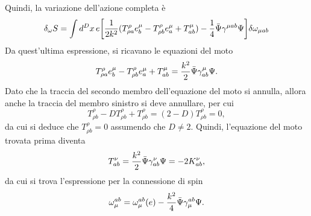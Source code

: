 Quindi, la variazione dell'azione completa è 
\begin{equation}
    \delta_\omega S = \int d^Dx\,e\bigg[\frac{1}{2k^2}(T^\rho_{\rho a}e^\mu_b - T^\rho_{\rho b}e^\mu_a + T^\mu_{ab}) - \frac{1}{4}\bar{\Psi}\gamma^{\mu ab}\Psi\bigg]\delta\omega_{\mu ab}
\end{equation}
Da quest'ultima espressione, si ricavano le equazioni del moto
\begin{equation}
    T^\rho_{\rho a}e^\mu_b - T^\rho_{\rho b}e^\mu_a + T^\mu_{ab} = \frac{k^2}{2}\bar{\Psi}\gamma^\mu_{ab}\Psi.
\end{equation}
Dato che la traccia del secondo membro dell'equazione del moto si annulla, allora anche la traccia del membro sinistro si deve annullare, per cui
\begin{equation}
    T^\rho_{\rho b} - DT^\rho_{\rho b} + T^\rho_{\rho b} = (2 - D)T^\rho_{\rho b} = 0,
\end{equation}
da cui si deduce che $T^\rho_{\rho b} = 0$ assumendo che $D \neq 2$. Quindi, l'equazione del moto trovata prima diventa
\begin{equation}
    T_{ab}^\nu = \frac{k^2}{2}\bar{\Psi}\gamma_{ab}^\nu\Psi = -2K^\nu_{ab},
\end{equation}
da cui si trova l'espressione per la connessione di spin
\begin{equation}
    \omega_\mu^{ab} = \omega_\mu^{ab}(e) - \frac{k^2}{4}\bar{\Psi}\gamma^{ab}_\mu\Psi.
\end{equation}
